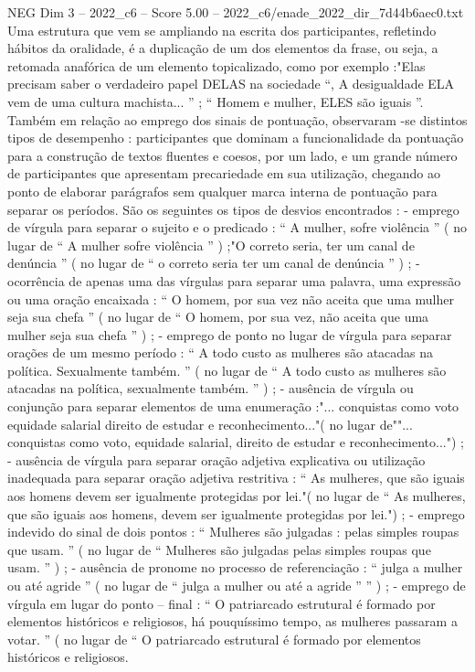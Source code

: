 \begin{textsample}{NEG Dim 3 – 2022\_c6 – Score 5.00 – 2022\_c6/enade\_2022\_dir\_7d44b6aec0.txt}
Uma estrutura que vem se ampliando na escrita dos participantes, refletindo hábitos da oralidade, é a duplicação de um dos elementos da frase, ou seja, a retomada anafórica de um elemento topicalizado, como por exemplo :"Elas precisam saber o verdadeiro papel DELAS na sociedade “, A desigualdade ELA vem de uma cultura machista... ” ; “ Homem e mulher, ELES são iguais ”.
Também em relação ao emprego dos sinais de pontuação, observaram -se distintos tipos de desempenho : participantes que dominam a funcionalidade da pontuação para a construção de textos fluentes e coesos, por um lado, e um grande número de participantes que apresentam precariedade em sua utilização, chegando ao ponto de elaborar parágrafos sem qualquer marca interna de pontuação para separar os períodos.
São os seguintes os tipos de desvios encontrados : - emprego de vírgula para separar o sujeito e o predicado : “ A mulher, sofre violência ” ( no lugar de “ A mulher sofre violência ” ) ;"O correto seria, ter um canal de denúncia ” ( no lugar de “ o correto seria ter um canal de denúncia ” ) ; - ocorrência de apenas uma das vírgulas para separar uma palavra, uma expressão ou uma oração encaixada : “ O homem, por sua vez não aceita que uma mulher seja sua chefa ” ( no lugar de “ O homem, por sua vez, não aceita que uma mulher seja sua chefa ” ) ; - emprego de ponto no lugar de vírgula para separar orações de um mesmo período : “ A todo custo as mulheres são atacadas na política.
Sexualmente também. ” ( no lugar de “ A todo custo as mulheres são atacadas na política, sexualmente também. ” ) ; - ausência de vírgula ou conjunção para separar elementos de uma enumeração :"... conquistas como voto equidade salarial direito de estudar e reconhecimento..."( no lugar de""... conquistas como voto, equidade salarial, direito de estudar e reconhecimento...") ; - ausência de vírgula para separar oração adjetiva explicativa ou utilização inadequada para separar oração adjetiva restritiva : “ As mulheres, que são iguais aos homens devem ser igualmente protegidas por lei."( no lugar de “ As mulheres, que são iguais aos homens, devem ser igualmente protegidas por lei.") ; - emprego indevido do sinal de dois pontos : “ Mulheres são julgadas : pelas simples roupas que usam. ” ( no lugar de “ Mulheres são julgadas pelas simples roupas que usam. ” ) ; - ausência de pronome no processo de referenciação : “ julga a mulher ou até agride ” ( no lugar de “ julga a mulher ou até a agride ” ” ) ; - emprego de vírgula em lugar do ponto – final : “ O patriarcado estrutural é formado por elementos históricos e religiosos, há pouquíssimo tempo, as mulheres passaram a votar. ” ( no lugar de “ O patriarcado estrutural é formado por elementos históricos e religiosos.

\end{textsample}
